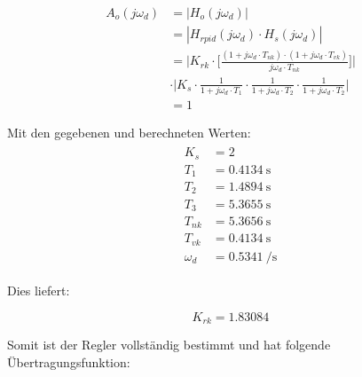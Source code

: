 \begin{equation} \label{eq:pid:h_o_k_rk_one}
    \begin{split}
        A_{o}(j\omega_d)    & = | H_{o}(j\omega_d) |                            \\
                            & = | H_{rpid}(j\omega_d) \cdot H_s(j\omega_d) |    \\
                            & = \Biggl \rvert
                                    K_{rk}
                                    \cdot
                                    \biggl[ \frac{(1 + j\omega_d \cdot T_{nk}) \cdot (1 + j\omega_d \cdot T_{vk}) }{ j\omega_d \cdot T_{nk} } \biggr] \Biggr \rvert \\
                            & \cdot
                                \Biggl \rvert
                                    K_s
                                    \cdot \frac{1}{1 + j\omega_d \cdot T_1}
                                    \cdot \frac{1}{1 + j\omega_d \cdot T_2}
                                    \cdot \frac{1}{1 + j\omega_d \cdot T_2}
                                    \Biggr \rvert \\
                            & = 1
    \end{split}
\end{equation}

Mit den gegebenen und berechneten Werten:
\begin{gather} \label{eq:pid:h_o_k_rk_one}
    \begin{split}
        K_s         & = 2                        \\
        T_1         & = \SI{0.4134}{\second}     \\
        T_2         & = \SI{1.4894}{\second}     \\
        T_3         & = \SI{5.3655}{\second}     \\
        T_{nk}      & = \SI{5.3656}{\second}     \\
        T_{vk}      & = \SI{0.4134}{\second}     \\
        \omega_d    & = \SI{0.5341}{\per\second}
    \end{split}
\end{gather}

Dies liefert:

\begin{equation} \label{eq:pid:k_rk_result}
    K_{rk} = 1.83084
\end{equation}

Somit ist der Regler vollst\"andig bestimmt und hat folgende \"Ubertragungsfunktion:


